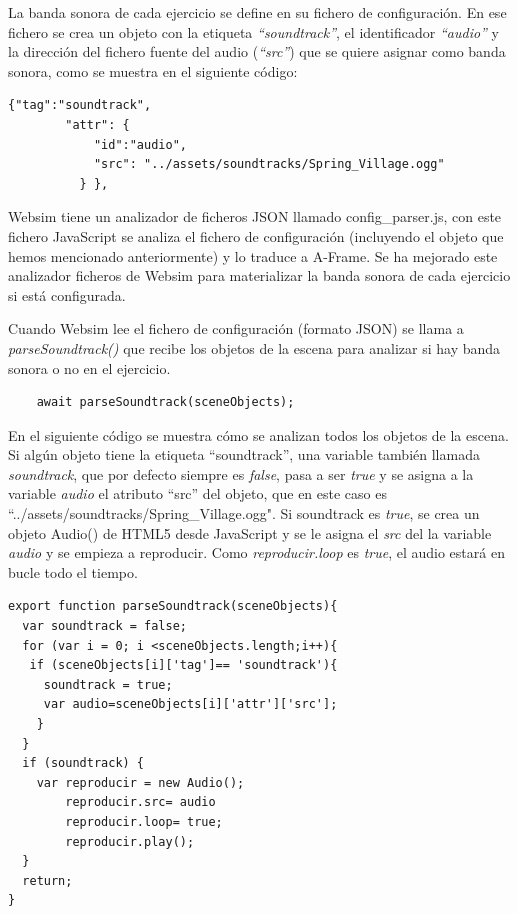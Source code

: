 La banda sonora de cada ejercicio se define en su fichero de configuración. En ese fichero se crea un objeto con la etiqueta \textit{``soundtrack''}, el identificador \textit{``audio''} y la dirección del fichero fuente del audio (\textit{``src''}) que se quiere asignar como banda sonora, como se muestra en el siguiente código:

\begin{lstlisting}
{"tag":"soundtrack",
        "attr": {
            "id":"audio",
            "src": "../assets/soundtracks/Spring_Village.ogg"
          } },
   \end{lstlisting}

Websim tiene un analizador de ficheros JSON llamado config\_parser.js, con este fichero JavaScript se analiza el fichero de configuración (incluyendo el objeto que hemos mencionado anteriormente) y lo traduce a A-Frame. Se ha mejorado este analizador ficheros de Websim para materializar la banda sonora de cada ejercicio si está configurada.

Cuando Websim lee el fichero de configuración (formato JSON) se llama a \textit{parseSoundtrack()} que recibe los objetos de la escena para analizar si hay banda sonora o no en el ejercicio.
\begin{lstlisting}
 	await parseSoundtrack(sceneObjects);
\end{lstlisting}

En el siguiente código se muestra cómo se analizan todos los objetos de la escena. Si algún objeto tiene la etiqueta ``soundtrack'', una variable también llamada \textit{soundtrack}, que por defecto siempre es \textit{false}, pasa a ser \textit{true} y se asigna a la variable \textit{audio} el atributo  ``src'' del objeto,  que en este caso es  ``../assets/soundtracks/Spring\_Village.ogg".  
Si soundtrack es \textit{true}, se crea un objeto Audio() de HTML5 desde JavaScript y se le asigna el \textit{src} del la variable \textit{audio} y se empieza a reproducir. Como \textit{reproducir.loop} es \textit{true}, el audio estará en bucle todo el tiempo.

\begin{lstlisting}
export function parseSoundtrack(sceneObjects){
  var soundtrack = false;
  for (var i = 0; i <sceneObjects.length;i++){
   if (sceneObjects[i]['tag']== 'soundtrack'){
     soundtrack = true;
     var audio=sceneObjects[i]['attr']['src'];
    }
  }
  if (soundtrack) {
    var reproducir = new Audio();
        reproducir.src= audio
        reproducir.loop= true;
        reproducir.play();
  }
  return;
}
\end{lstlisting}

